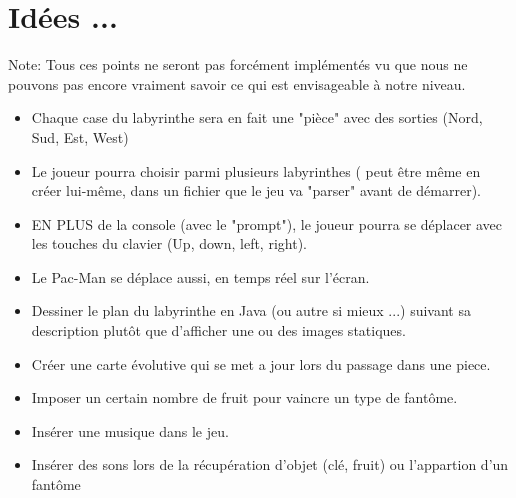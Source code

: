 \documentclass[twoside,french]{article}
\begin{document}
\section{Idées ...}
Note: Tous ces points ne seront pas forcément implémentés vu que nous ne pouvons pas encore 
vraiment savoir ce qui est envisageable à notre niveau.
   \begin{itemize}
      \item Chaque case du labyrinthe sera en fait une "pièce" avec des sorties
      (Nord, Sud, Est, West)
      \item Le joueur pourra choisir parmi plusieurs labyrinthes ( peut être même en 
      créer lui-même, dans un fichier que le jeu va "parser" avant de démarrer). %
      \item EN PLUS de la console (avec le "prompt"), le joueur pourra se déplacer avec les 
      touches du clavier (Up, down, left, right).
      \item Le Pac-Man se déplace aussi, en temps réel sur l'écran.
      \item Dessiner le plan du labyrinthe en Java (ou autre si mieux ...) suivant sa description
      plutôt que d'afficher une ou des images statiques.
      \item Créer une carte évolutive qui se met a jour lors du passage dans une piece.
      \item Imposer un certain nombre de fruit pour vaincre un type de fantôme.
      \item Insérer une musique dans le jeu.
      \item Insérer des sons lors de la récupération d'objet (clé, fruit) ou l'appartion d'un fantôme
   \end{itemize}
\end{document}
